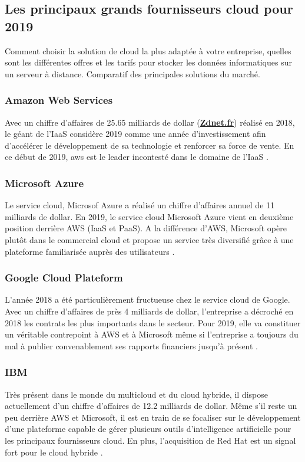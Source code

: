 \subsection{Les principaux grands fournisseurs cloud pour 2019}  


Comment choisir la solution de cloud la plus adaptée à votre entreprise, quelles sont les différentes offres et les tarifs pour stocker les données informatiques sur un serveur à distance. Comparatif des principales solutions du marché.

\subsubsection{Amazon Web Services }

Avec un chiffre d’affaires de 25.65 milliards de dollar (\textbf{\underline{Zdnet.fr}}) réalisé en 2018, le géant de l’IaaS considère 2019 comme une année d’investissement afin d’accélérer le développement de sa technologie et renforcer sa force de vente. En ce début de 2019, \ac{aws} est le leader incontesté dans le domaine de l’IaaS \parencite{cloud2019}.

\subsubsection{Microsoft Azure}
Le service cloud, Microsof Azure a réalisé un chiffre d’affaires annuel de 11 milliards de dollar. En 2019, le service cloud Microsoft Azure vient en deuxième position derrière AWS (IaaS et PaaS). A la différence d’AWS, Microsoft opère plutôt dans le commercial cloud et propose un service très diversifié grâce à une plateforme familiarisée auprès des utilisateurs \parencite{cloud2019}.


\subsubsection{Google Cloud Plateform}
L’année 2018 a été particulièrement fructueuse chez le service cloud de Google. Avec un chiffre d’affaires de près 4 milliards de dollar, l’entreprise a décroché en 2018 les contrats les plus importants dans le secteur. Pour 2019, elle va constituer un véritable contrepoint à AWS et à Microsoft même si l’entreprise a toujours du mal à publier convenablement ses rapports financiers jusqu'à présent \parencite{cloud2019}.

\subsubsection{IBM}
Très présent dans le monde du multicloud et du cloud hybride, il dispose actuellement d’un chiffre d’affaires de 12.2 milliards de dollar. Même s’il reste un peu derrière AWS et Microsoft, il est en train de se focaliser sur le développement d’une plateforme capable de gérer plusieurs outils d’intelligence artificielle pour les principaux fournisseurs cloud. En plus, l’acquisition de Red Hat est un signal fort pour le cloud hybride \parencite{cloud2019}.

